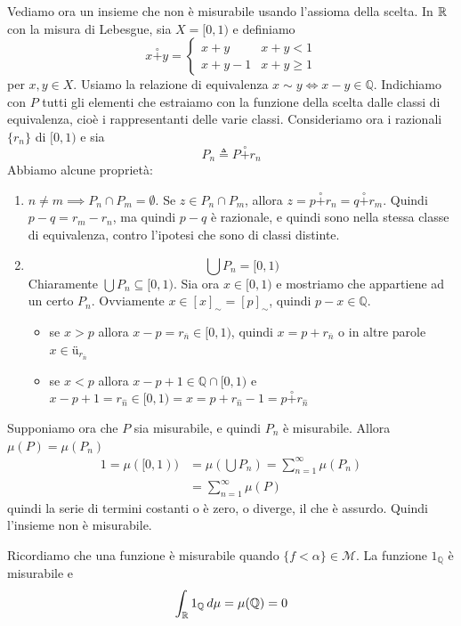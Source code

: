 \documentclass[a4paper]{article}
\begin{document}
Vediamo ora un insieme che non è misurabile usando l'assioma della scelta.
In \(\mathbb{R}\) con la misura di Lebesgue, sia \(X = [0, 1)\)
e definiamo \[
    x \overset{\circ}{+} y = \begin{cases}
        x + y & x + y < 1 \\
        x + y - 1 & x + y \geq 1
    \end{cases}
\]
per \(x,y\in X\). Usiamo la relazione di equivalenza \(x \sim y \iff x-y\in\mathbb{Q}\).
Indichiamo con \(P\) tutti gli elementi che estraiamo con la funzione della scelta dalle classi di equivalenza,
cioè i rappresentanti delle varie classi.
Consideriamo ora i razionali \(\{r_n\}\) di \([0, 1)\) e sia
\[
    P_n \triangleq P \overset{\circ}{+} r_n
\]
Abbiamo alcune proprietà:
\begin{enumerate}
    \item \(n \neq m \implies P_n \cap P_m = \emptyset\).
    Se \(z \in P_n \cap P_m\), allora \(z = p \overset{\circ}{+} r_n = q \overset{\circ}{+} r_m\).
    Quindi \(p-q = r_m - r_n\), ma quindi \(p-q\) è razionale, e quindi sono nella stessa classe di equivalenza,
    contro l'ipotesi che sono di classi distinte.
    \item \[
        \bigcup P_n = [0,1)
    \]
    Chiaramente \(\bigcup P_n \subseteq [0,1)\). Sia ora \(x\in [0,1)\) e mostriamo che appartiene
    ad un certo \(P_n\). Ovviamente \(x\in {[x]}_\sim = {[p]}_\sim\), quindi \(p-x\in\mathbb{Q}\).
    \begin{itemize}
        \item se \(x > p\) allora \(x-p = r_{\overline{n}} \in [0,1)\), quindi
        \(x = p + r_{\overline{n}}\) o in altre parole \(x \in ü_{r_{\overline{n}}}\)
        \item se \(x < p\) allora \(x-p+1 \in \mathbb{Q} \cap [0,1)\) e
        \(x-p+1 = r_{\hat{n}} \in [0,1) = x = p + r_{\hat{n}} - 1 = p \overset{\circ}{+} r_{\hat{n}}\)
    \end{itemize}
\end{enumerate}
Supponiamo ora che \(P\) sia misurabile, e quindi \(P_n\) è misurabile.
Allora \(\mu(P) = \mu(P_n)\)
\begin{align*}
    1 = \mu([0,1)) &= \mu\left(\bigcup P_n\right) = \sum_{n=1}^\infty \mu(P_n) \\
    &= \sum_{n=1}^\infty \mu(P)
\end{align*}
quindi la serie di termini costanti o è zero, o diverge, il che è assurdo.
Quindi l'insieme non è misurabile.

Ricordiamo che una funzione è misurabile quando \(\{f < \alpha\} \in \mathcal{M}\).
La funzione \(1_{\mathbb{Q}}\) è misurabile e
\[
    \int_{\mathbb{R}} 1_{\mathbb{Q}}\,d\mu = \mu(\mathbb{Q}) = 0
\]
\end{document}
